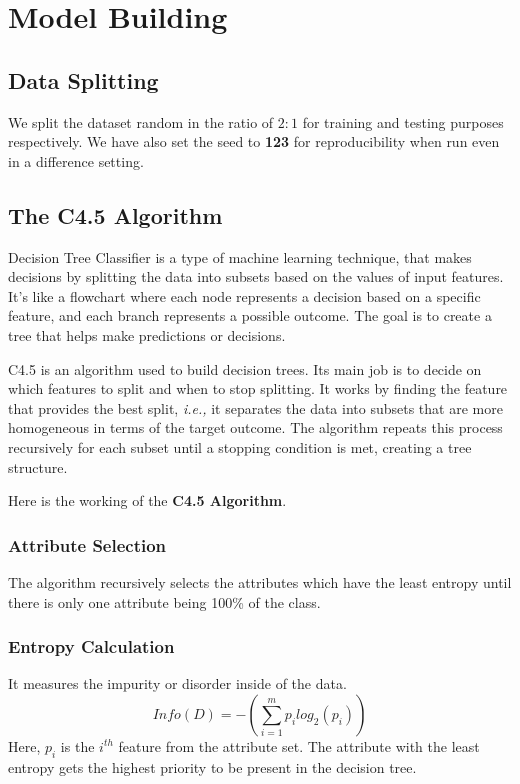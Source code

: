 \documentclass{article}
\begin{document}
\section{Model Building}\label{sec:building}
\subsection{Data Splitting}
We split the dataset random in the ratio of $2:1$ for training and testing purposes respectively. We have also set the seed to \textbf{123} for reproducibility when run even in a difference setting.

\subsection{The C4.5 Algorithm}
Decision Tree Classifier is a type of machine learning technique, that makes decisions by splitting the data into subsets based on the values of input features. It's like a flowchart where each node represents a decision based on a specific feature, and each branch represents a possible outcome. The goal is to create a tree that helps make predictions or decisions.

C4.5 is an algorithm used to build decision trees. Its main job is to decide on which features to split and when to stop splitting. It works by finding the feature that provides the best split, \textit{i.e.,} it separates the data into subsets that are more homogeneous in terms of the target outcome. The algorithm repeats this process recursively for each subset until a stopping condition is met, creating a tree structure.

Here is the working of the \textbf{C4.5 Algorithm}.
\subsubsection{Attribute Selection}
The algorithm recursively selects the attributes which have the least entropy until there is only one attribute being 100\% of the class.

\subsubsection{Entropy Calculation}
It measures the impurity or disorder inside of the data.
\begin{equation}
    Info(D) = - (\sum_{i=1}^{m}p_i log_2(p_i))
\end{equation}
Here, $p_i$ is the $i^{th}$ feature from the attribute set. The attribute with the least entropy gets the highest priority to be present in the decision tree.
\end{document}
